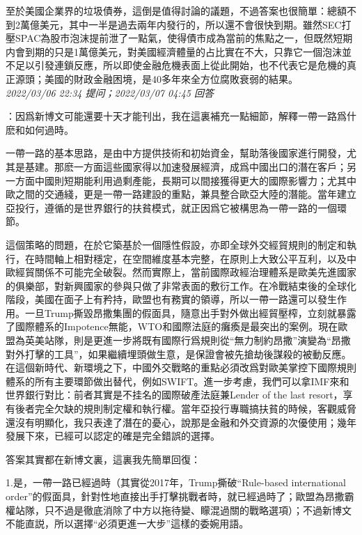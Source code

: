 \documentclass[twocolumn]{ctexart}
\begin{document}
至於美國企業界的垃圾債券，這倒是值得討論的議題，不過答案也很簡單：總額不到2萬億美元，其中一半是過去兩年内發行的，所以還不會很快到期。雖然SEC打壓SPAC為股市泡沫提前泄了一點氣，使得債市成為當前的焦點之一，但既然短期内會到期的只是1萬億美元，對美國經濟體量的占比實在不大，只靠它一個泡沫並不足以引發連鎖反應，所以即使金融危機表面上從此開始，也不代表它是危機的真正源頭；美國的財政金融困境，是40多年來全方位腐敗衰弱的結果。
\\

\textit{\hfill\noindent\small 2022/03/06 22:34 提问；2022/03/07 04:45 回答}

：因爲新博文可能還要十天才能刊出，我在這裏補充一點細節，解釋一帶一路爲什麽和如何過時。

一帶一路的基本思路，是由中方提供技術和初始資金，幫助落後國家進行開發，尤其是基建。那麽一方面這些國家得以加速發展經濟，成爲中國出口的潛在客戶；另一方面中國則短期能利用過剩產能，長期可以間接獲得更大的國際影響力；尤其中歐之間的交通綫，更是一帶一路建設的重點，兼具整合歐亞大陸的潛能。當年建立亞投行，遵循的是世界銀行的扶貧模式，就正因爲它被構思為一帶一路的一個環節。

這個策略的問題，在於它築基於一個隱性假設，亦即全球外交經貿規則的制定和執行，在時間軸上相對穩定，在空間維度基本完整，在原則上大致公平互利，以及中歐經貿關係不可能完全破裂。然而實際上，當前國際政經治理體系是歐美先進國家的俱樂部，對新興國家的參與只做了非常表面的敷衍工作。在冷戰結束後的全球化階段，美國在面子上有矜持，歐盟也有務實的領導，所以一帶一路還可以發生作用。一旦Trump撕毀昂撒集團的假面具，隨意出手對外做出經貿壓榨，立刻就暴露了國際體系的Impotence無能，WTO和國際法庭的癱瘓是最突出的案例。現在歐盟為英美站隊，則是更進一步將既有國際行爲規則從“無力制約昂撒”演變為“昂撒對外打擊的工具”，如果繼續埋頭做生意，是保證會被先搶劫後謀殺的被動反應。在這個新時代、新環境之下，中國外交戰略的重點必須改爲對歐美掌控下國際規則體系的所有主要環節做出替代，例如SWIFT。進一步考慮，我們可以拿IMF來和世界銀行對比：前者其實是不挂名的國際破產法庭兼Lender of the last resort，享有後者完全欠缺的規則制定權和執行權。當年亞投行專職搞扶貧的時候，客觀威脅還沒有明顯化，我只表達了潛在的憂心，說那是金融和外交資源的次優使用；幾年發展下來，已經可以認定的確是完全錯誤的選擇。


答案其實都在新博文裏，這裏我先簡單回復：

1.是，一帶一路已經過時（其實從2017年，Trump撕破“Rule-based international order”的假面具，針對性地直接出手打擊挑戰者時，就已經過時了；歐盟為昂撒霸權站隊，只不過是徹底消除了中方以拖待變、矇混過關的戰略選項）；不過新博文不能直説，所以選擇“必須更進一大步”這樣的委婉用語。
\end{document}
